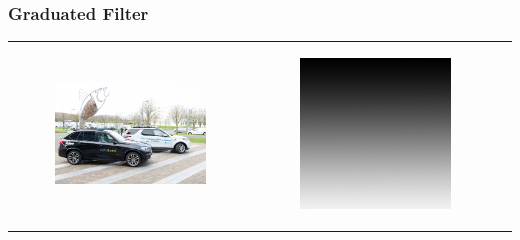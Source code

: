 \begin{frame}\frametitle{Graduated Filter}
\begin{tabular}{ccc}
        \begin{minipage}{0.3\textwidth}
            \begin{figure}[H]

	    \includegraphics[width=\textwidth]{images/DSC_0636.jpg}
    \end{figure}
        \end{minipage}
        &
        \begin{minipage}{0.27\textwidth}
            
            \begin{figure}[H]

	    \includegraphics[width=\textwidth]{images/GraduatedFilter.jpg}
	     \end{figure}
        \end{minipage}
        &
        \begin{minipage}{0.3\textwidth}
            

\end{minipage}
\end{tabular}
\end{frame}
